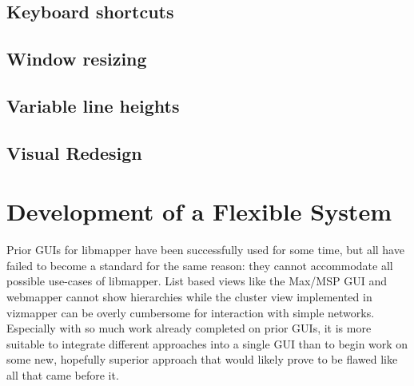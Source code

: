 	\subsection{Keyboard shortcuts} %
	\label{sec:keyboard_shortcuts}

	

	\subsection{Window resizing} %
	\label{sec:window_resizing}
	

	\subsection{Variable line heights} %
	\label{sec:variable_line_heights}
	

	\subsection{Visual Redesign} %
	\label{sec:visual_redesign}
	


\section{Development of a Flexible System} %
\label{sec:development_of_a_flexible_system}

Prior GUIs for libmapper have been successfully used for some time, but all have failed to become a standard for the same reason: they cannot accommodate all possible use-cases of libmapper. List based views like the Max/MSP GUI and webmapper cannot show hierarchies while the cluster view implemented in vizmapper can be overly cumbersome for interaction with simple networks. Especially with so much work already completed on prior GUIs, it is more suitable to integrate different approaches into a single GUI than to begin work on some new, hopefully superior approach that would likely prove to be flawed like all that came before it. 

